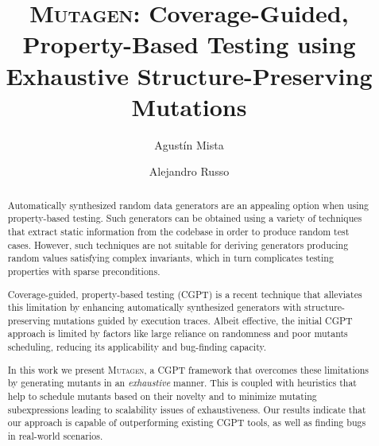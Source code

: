 \documentclass[sigconf, anonymous, review]{acmart}
\newcommand{\mutagen}{\textsc{Mutagen}\xspace}
\begin{document}
\title[\mutagen]{\mutagen: Coverage-Guided, Property-Based Testing using
  Exhaustive Structure-Preserving Mutations}


\author{Agust\'in Mista}

\author{Alejandro Russo}





\begin{abstract}
Automatically synthesized random data generators are an appealing option when
using property-based testing.
%
Such generators can be obtained using a variety of techniques that extract
static information from the codebase in order to produce random test cases.
%
However, such techniques are not suitable for deriving generators producing
random values satisfying complex invariants, which in turn complicates testing
properties with sparse preconditions.


Coverage-guided, property-based testing (CGPT) is a recent technique that
alleviates this limitation by enhancing automatically synthesized generators
with structure-preserving mutations guided by execution traces.
%
Albeit effective, the initial CGPT approach is limited by factors like large
reliance on randomness and poor mutants scheduling, reducing its applicability
and bug-finding capacity.


In this work we present \mutagen, a CGPT framework that overcomes these
limitations by generating mutants in an \emph{exhaustive} manner.
%
This is coupled with heuristics that help to schedule mutants based on their
novelty and to minimize mutating subexpressions leading to scalability issues of
exhaustiveness.
%
Our results indicate that our approach is capable of outperforming existing CGPT
tools, as well as finding bugs in real-world scenarios.
\end{abstract}
\end{document}
